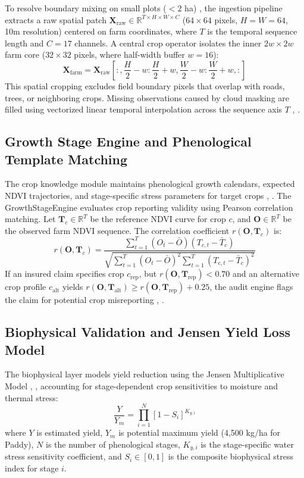 \documentclass[conference]{IEEEtran}
\begin{document}
To resolve boundary mixing on small plots ($<2$ ha) \cite{b18}, the ingestion pipeline extracts a raw spatial patch $\mathbf{X}_{\text{raw}} \in \mathbb{R}^{T \times H \times W \times C}$ ($64 \times 64$ pixels, $H=W=64$, 10m resolution) centered on farm coordinates, where $T$ is the temporal sequence length and $C = 17$ channels. A central crop operator isolates the inner $2w \times 2w$ farm core ($32 \times 32$ pixels, where half-width buffer $w=16$):
\begin{equation}
\mathbf{X}_{\text{farm}} = \mathbf{X}_{\text{raw}}\left[:, \frac{H}{2}-w : \frac{H}{2}+w, \frac{W}{2}-w : \frac{W}{2}+w, :\right]
\end{equation}
This spatial cropping excludes field boundary pixels that overlap with roads, trees, or neighboring crops. Missing observations caused by cloud masking are filled using vectorized linear temporal interpolation across the sequence axis $T$ \cite{b4}, \cite{b15}.

\subsection{Growth Stage Engine and Phenological Template Matching}
The crop knowledge module maintains phenological growth calendars, expected NDVI trajectories, and stage-specific stress parameters for target crops \cite{b16}, \cite{b21}. The \textsf{GrowthStageEngine} evaluates crop reporting validity using Pearson correlation matching. Let $\mathbf{T}_{c} \in \mathbb{R}^T$ be the reference NDVI curve for crop $c$, and $\mathbf{O} \in \mathbb{R}^T$ be the observed farm NDVI sequence. The correlation coefficient $r(\mathbf{O}, \mathbf{T}_c)$ is:
\begin{equation}
r(\mathbf{O}, \mathbf{T}_c) = \frac{\sum_{t=1}^T (O_t - \bar{O})(T_{c,t} - \bar{T}_c)}{\sqrt{\sum_{t=1}^T (O_t - \bar{O})^2 \sum_{t=1}^T (T_{c,t} - \bar{T}_c)^2}}
\end{equation}
If an insured claim specifies crop $c_{\text{rep}}$, but $r(\mathbf{O}, \mathbf{T}_{\text{rep}}) < 0.70$ and an alternative crop profile $c_{\text{alt}}$ yields $r(\mathbf{O}, \mathbf{T}_{\text{alt}}) \ge r(\mathbf{O}, \mathbf{T}_{\text{rep}}) + 0.25$, the audit engine flags the claim for potential crop misreporting \cite{b7}, \cite{b9}.

\subsection{Biophysical Validation and Jensen Yield Loss Model}
The biophysical layer models yield reduction using the Jensen Multiplicative Model \cite{b2}, \cite{b16}, accounting for stage-dependent crop sensitivities to moisture and thermal stress:
\begin{equation}
\frac{Y}{Y_m} = \prod_{i=1}^{N} \left[1 - S_i\right]^{K_{y,i}}
\end{equation}
where $Y$ is estimated yield, $Y_m$ is potential maximum yield (4,500 kg/ha for Paddy), $N$ is the number of phenological stages, $K_{y,i}$ is the stage-specific water stress sensitivity coefficient, and $S_i \in [0, 1]$ is the composite biophysical stress index for stage $i$.
\end{document}
